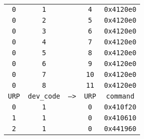 \begin{adjustwidth}{5ex}{1ex}
\begin{tabular}{ccccc}
		\texttt{0} & \texttt{1} & & \texttt{4} & \texttt{0x4120e0} \\
		\texttt{0} & \texttt{2} & & \texttt{5} & \texttt{0x4120e0} \\
		\texttt{0} & \texttt{3} & & \texttt{6} & \texttt{0x4120e0} \\
		\texttt{0} & \texttt{4} & & \texttt{7} & \texttt{0x4120e0} \\
		\texttt{0} & \texttt{5} & & \texttt{8} & \texttt{0x4120e0} \\
		\texttt{0} & \texttt{6} & & \texttt{9} & \texttt{0x4120e0} \\
		\texttt{0} & \texttt{7} & & \texttt{10} & \texttt{0x4120e0} \\
		\texttt{0} & \texttt{8} & & \texttt{11} & \texttt{0x4120e0} \\
		\texttt{URP} & \texttt{dev\_code} & \texttt{-->} & \texttt{URP} & \texttt{command} \\
		\texttt{0} & \texttt{1} & & \texttt{0} & \texttt{0x410f20} \\
		\texttt{1} & \texttt{1} & & \texttt{0} & \texttt{0x410610} \\
		\texttt{2} & \texttt{1} & & \texttt{0} & \texttt{0x441960} \\
	\end{tabular}
\end{adjustwidth}
